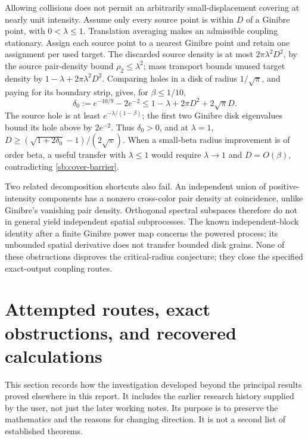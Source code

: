 \documentclass[11pt,a4paper]{article}
\theoremstyle{definition}
\theoremstyle{remark}
\numberwithin{equation}{section}
\begin{document}
Allowing collisions does not permit an arbitrarily small-displacement
covering at nearly unit intensity. Assume only every source point is
within $D$ of a Ginibre point, with $0<\lambda\le1$.
Translation averaging makes an admissible coupling stationary.
Assign each source point to a nearest Ginibre point and retain one
assignment per used target. The discarded source density is at most
$2\pi\lambda^2D^2$, by the source pair-density bound $\rho_2\le\lambda^2$;
mass transport bounds unused target density by
$1-\lambda+2\pi\lambda^2D^2$.
Comparing holes in a disk of radius $1/\sqrt\pi$, and paying for its
boundary strip, gives, for $\beta\le1/10$,
\begin{equation}\label{sb:cover-barrier}
 \delta_0:=e^{-10/9}-2e^{-2}
       \le1-\lambda+2\pi D^2+2\sqrt\pi D.
\end{equation}
The source hole is at least $e^{-\lambda/(1-\beta)}$; the first two
Ginibre disk eigenvalues bound its hole above by $2e^{-2}$.
Thus $\delta_0>0$, and at $\lambda=1$,
$D\ge(\sqrt{1+2\delta_0}-1)/(2\sqrt\pi)$.
When a small-beta radius improvement is of order beta, a useful
transfer with $\lambda\le1$ would require $\lambda\to1$ and
$D=O(\beta)$, contradicting \eqref{sb:cover-barrier}.

Two related decomposition shortcuts also fail. An independent union
of positive-intensity components has a nonzero cross-color pair density
at coincidence, unlike Ginibre's vanishing pair density. Orthogonal
spectral subspaces therefore do not in general yield independent
spatial subprocesses. The known independent-block identity after a
finite Ginibre power map concerns the powered process; its unbounded
spatial derivative does not transfer bounded disk grains. None of
these obstructions disproves the critical-radius conjecture; they
close the specified exact-output coupling routes.


\section{Attempted routes, exact obstructions, and recovered calculations}
\label{br:investigation}

This section records how the investigation developed beyond the principal
results proved elsewhere in this report.  It includes the earlier research
history supplied by the user, not just the later working notes.  Its purpose
is to preserve the mathematics and the reasons for changing direction.
It is not a second list of established theorems.
\end{document}
